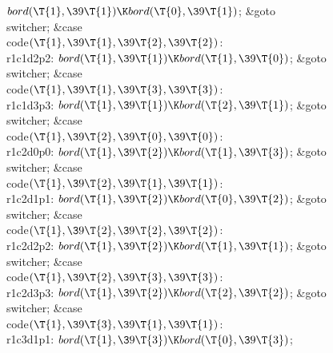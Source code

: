 ${}\\{bord}(\T{1},\39\T{1})\K\\{bord}(\T{0},\39\T{1}){}$;\5
\&{goto} \\{switcher};\6
\4\&{case} \\{code}${}(\T{1},\39\T{1},\39\T{2},\39\T{2}){}$:\5
\\{r1c1d2p2}:\5
${}\\{bord}(\T{1},\39\T{1})\K\\{bord}(\T{1},\39\T{0}){}$;\5
\&{goto} \\{switcher};\6
\4\&{case} \\{code}${}(\T{1},\39\T{1},\39\T{3},\39\T{3}){}$:\5
\\{r1c1d3p3}:\5
${}\\{bord}(\T{1},\39\T{1})\K\\{bord}(\T{2},\39\T{1}){}$;\5
\&{goto} \\{switcher};\6
\4\&{case} \\{code}${}(\T{1},\39\T{2},\39\T{0},\39\T{0}){}$:\5
\\{r1c2d0p0}:\5
${}\\{bord}(\T{1},\39\T{2})\K\\{bord}(\T{1},\39\T{3}){}$;\5
\&{goto} \\{switcher};\6
\4\&{case} \\{code}${}(\T{1},\39\T{2},\39\T{1},\39\T{1}){}$:\5
\\{r1c2d1p1}:\5
${}\\{bord}(\T{1},\39\T{2})\K\\{bord}(\T{0},\39\T{2}){}$;\5
\&{goto} \\{switcher};\6
\4\&{case} \\{code}${}(\T{1},\39\T{2},\39\T{2},\39\T{2}){}$:\5
\\{r1c2d2p2}:\5
${}\\{bord}(\T{1},\39\T{2})\K\\{bord}(\T{1},\39\T{1}){}$;\5
\&{goto} \\{switcher};\6
\4\&{case} \\{code}${}(\T{1},\39\T{2},\39\T{3},\39\T{3}){}$:\5
\\{r1c2d3p3}:\5
${}\\{bord}(\T{1},\39\T{2})\K\\{bord}(\T{2},\39\T{2}){}$;\5
\&{goto} \\{switcher};\6
\4\&{case} \\{code}${}(\T{1},\39\T{3},\39\T{1},\39\T{1}){}$:\5
\\{r1c3d1p1}:\5
${}\\{bord}(\T{1},\39\T{3})\K\\{bord}(\T{0},\39\T{3}){}$;\5

